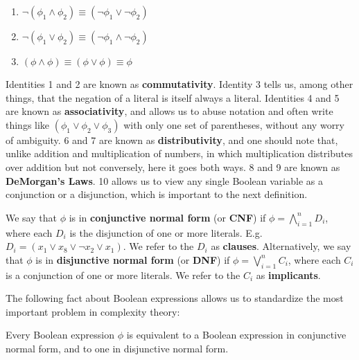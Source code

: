 \begin{definition}
\begin{enumerate}
    \item $\neg(\phi_1 \wedge \phi_2) \equiv (\neg \phi_1 \vee \neg \phi_2)$
    \item $\neg(\phi_1 \vee \phi_2) \equiv (\neg \phi_1 \wedge \neg \phi_2)$
    \item $(\phi \wedge \phi) \equiv (\phi \vee \phi) \equiv \phi$
\end{enumerate}
Identities 1 and 2 are known as \textbf{commutativity}. Identity 3 tells us, among other things, that the negation of a literal is itself always a literal. Identities 4 and 5 are known as \textbf{associativity}, and allows us to abuse notation and often write things like $(\phi_1 \vee \phi_2 \vee \phi_3)$ with only one set of parentheses, without any worry of ambiguity. 6 and 7 are known as \textbf{distributivity}, and one should note that, unlike addition and multiplication of numbers, in which multiplication distributes over addition but not conversely, here it goes both ways. 8 and 9 are known as \textbf{DeMorgan's Laws}. 10 allows us to view any single Boolean variable as a conjunction or a disjunction, which is important to the next definition. 
\par We say that $\phi$ is in \textbf{conjunctive normal form} (or \textbf{CNF}) if $\phi = \bigwedge_{i=1}^{n} D_i$, where each $D_i$ is the disjunction of one or more literals. E.g. $D_i = (x_1 \vee x_8 \vee \neg x_2 \vee x_1)$. We refer to the $D_i$ as \textbf{clauses}. Alternatively, we say that $\phi$ is in \textbf{disjunctive normal form} (or \textbf{DNF}) if $\phi = \bigvee_{i=1}^{n} C_i$, where each $C_i$ is a conjunction of one or more literals. We refer to the $C_i$ as \textbf{implicants}.
\end{definition}
The following fact about Boolean expressions allows us to standardize the most important problem in complexity theory:
\begin{fact}
    Every Boolean expression $\phi$ is equivalent to a Boolean expression in conjunctive normal form, and to one in disjunctive normal form.
\end{fact}
